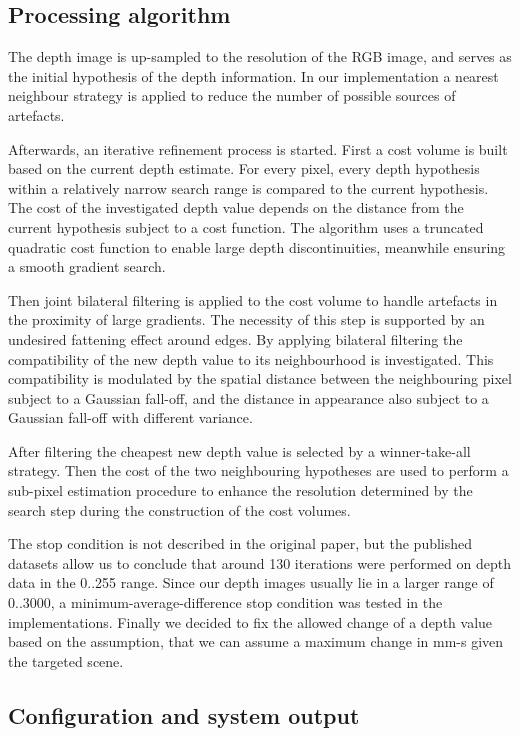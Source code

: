 \documentclass{ucl_thesis}
\begin{document}
\subsection{Processing algorithm}
\par The depth image is up-sampled to the resolution of the RGB image, and
serves as the initial hypothesis of the depth information. In our implementation a nearest neighbour strategy is applied to reduce the number of possible sources of artefacts. 
\par Afterwards, an iterative refinement process is started. First a cost volume is built based on the current depth estimate. For every pixel, every depth hypothesis within a relatively narrow search range is compared to the current hypothesis. The cost of the investigated depth value depends on the distance from the current hypothesis subject to a cost function. The algorithm uses a truncated quadratic cost function to enable large depth discontinuities, meanwhile ensuring a smooth gradient search.
\par Then joint bilateral filtering is applied to the cost volume to handle artefacts in the proximity of large gradients. The necessity of this step is supported by an undesired fattening effect around edges. By applying bilateral filtering the compatibility of the new depth value to its neighbourhood is investigated. This compatibility is modulated by the spatial distance between the neighbouring pixel subject to a Gaussian fall-off, and the distance in appearance also subject to a Gaussian fall-off with different variance.
\par After filtering the cheapest new depth value is selected by a winner-take-all strategy. Then the cost of the two neighbouring hypotheses are used to perform a sub-pixel estimation procedure to enhance the resolution determined by the search step during the construction of the cost volumes.

\par The stop condition is not described in the original paper, but the published datasets allow us to conclude that around 130 iterations were performed on depth data in the 0..255 range. Since our depth images usually lie in a larger range of 0..3000, a minimum-average-difference stop condition was tested in the implementations. Finally we decided to fix the allowed change of a depth value based on the assumption, that we can assume a maximum change in mm-s given the targeted scene.

\subsection{Configuration and system output}
\end{document}
